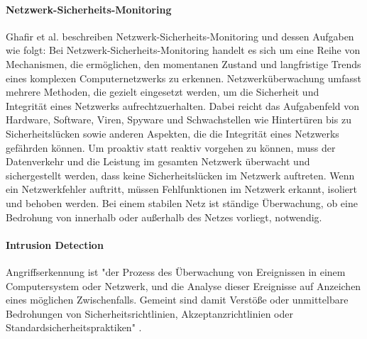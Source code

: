 \paragraph{Netzwerk-Sicherheits-Monitoring}
Ghafir et al. \cite{ghafir_network_2015} beschreiben Netzwerk-Sicherheits-Monitoring und dessen Aufgaben wie folgt: %
Bei Netzwerk-Sicherheits-Monitoring handelt es sich um eine Reihe von Mechanismen, die ermöglichen, den momentanen Zustand und langfristige Trends eines komplexen Computernetzwerks zu erkennen. Netzwerküberwachung umfasst mehrere Methoden, die gezielt eingesetzt werden, um die Sicherheit und Integrität eines Netzwerks aufrechtzuerhalten. Dabei reicht das Aufgabenfeld von Hardware, Software, Viren, Spyware und Schwachstellen wie Hintertüren bis zu Sicherheitslücken sowie anderen Aspekten, die die Integrität eines Netzwerks gefährden können. Um proaktiv statt reaktiv vorgehen zu können, muss der Datenverkehr und die Leistung im gesamten Netzwerk überwacht und sichergestellt werden, dass keine Sicherheitslücken im Netzwerk auftreten. Wenn ein Netzwerkfehler auftritt, müssen Fehlfunktionen im Netzwerk erkannt, isoliert und behoben werden. Bei einem stabilen Netz ist ständige Überwachung, ob eine Bedrohung von innerhalb oder außerhalb des Netzes vorliegt, notwendig.
\paragraph{Intrusion Detection}
Angriffserkennung ist "der Prozess des Überwachung von Ereignissen in einem Computersystem oder Netzwerk, und die Analyse dieser Ereignisse auf Anzeichen eines möglichen Zwischenfalls. Gemeint sind damit Verstöße oder unmittelbare Bedrohungen von Sicherheitsrichtlinien, Akzeptanzrichtlinien oder Standardsicherheitspraktiken" \cite{scarfone2007guide}. 

